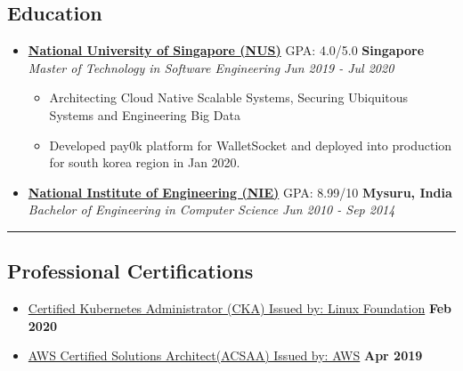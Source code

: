 \documentclass[11pt,a4paper]{article}
\begin{document}
\subsection*{Education}
  \begin{itemize}
    \parskip=-0.5em

    \item[]
    {\href{http://www.nus.edu.sg/}{\textbf{National University of Singapore (NUS)}} {GPA: 4.0/5.0} \hfill
      \textbf{Singapore}}
    \\
    {\emph{Master of Technology in Software Engineering} \hfill
      \emph{Jun 2019 - Jul 2020}}

    \begin{itemize}[label=\textbullet]
      \item Architecting Cloud Native Scalable Systems, Securing Ubiquitous Systems and Engineering Big Data
      \item Developed pay0k platform for WalletSocket and deployed into production for south korea region in Jan 2020.
    \end{itemize}

    \item[]
    {\href{https://www.nie.ac.in/}{\textbf{National Institute of Engineering (NIE)}} {GPA: 8.99/10} \hfill
      \textbf{Mysuru, India}}
    \\
    {\emph{Bachelor of Engineering in Computer Science} \hfill
      \emph{Jun 2010 - Sep 2014}}

  \end{itemize}
  
\hrule
\vspace{-1.0em}
\subsection*{Professional Certifications}
\begin{itemize}
    \parskip=-0.4em
  \item
  {\href{https://www.youracclaim.com/badges/ef62e195-5e7f-4990-aacf-3b77567e03a2}{Certified Kubernetes Administrator (CKA) Issued by: Linux Foundation}\hfill
      \textbf{Feb 2020}}
  \item
  {\href{https://www.certmetrics.com/amazon/public/badge.aspx?i=1&t=c&d=2019-04-06&ci=AWS00799157}{AWS Certified Solutions Architect(ACSAA) Issued by: AWS}\hfill
      \textbf{Apr 2019}}
\end{itemize}
\end{document}
